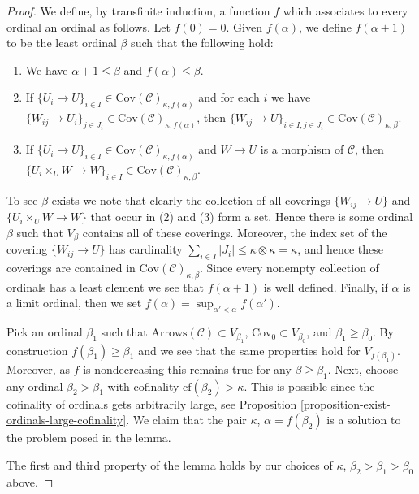 \begin{proof}
\medskip\noindent
We define, by transfinite induction, a function $f$ which associates
to every ordinal an ordinal as follows. Let $f(0) = 0$.
Given $f(\alpha)$, we define $f(\alpha + 1)$ to be the least
ordinal $\beta$ such that the following hold:
\begin{enumerate}
\item We have $\alpha + 1 \leq \beta$ and $f(\alpha) \leq \beta$.
\item If $\{U_i \to U\}_{i\in I}
\in \text{Cov}(\mathcal{C})_{\kappa, f(\alpha)}$
and for each $i$ we have
$\{W_{ij} \to U_i\}_{j\in J_i}
\in \text{Cov}(\mathcal{C})_{\kappa, f(\alpha)}$,
then
$\{W_{ij} \to U\}_{i \in I, j\in J_i}
\in \text{Cov}(\mathcal{C})_{\kappa, \beta}$.
\item If $\{U_i \to U\}_{i\in I}
\in \text{Cov}(\mathcal{C})_{\kappa, f(\alpha)}$
and $W \to U$ is a morphism of $\mathcal{C}$, then
$\{U_i \times_U W \to W \}_{i\in I}
\in \text{Cov}(\mathcal{C})_{\kappa, \beta}$.
\end{enumerate}
To see $\beta$ exists we note that clearly the collection of all
coverings $\{W_{ij} \to U\}$ and $\{U_i \times_U W \to W \}$ that occur in
(2) and (3) form a set. Hence there is some ordinal $\beta$ such that
$V_\beta$ contains all of these coverings. Moreover, the index set
of the covering $\{W_{ij} \to U\}$ has cardinality
$\sum_{i \in I} |J_i| \leq \kappa \otimes \kappa = \kappa$, and
hence these coverings are contained in
$\text{Cov}(\mathcal{C})_{\kappa, \beta}$.
Since every nonempty collection of ordinals has a least element
we see that $f(\alpha + 1)$ is well defined. Finally, if $\alpha$
is a limit ordinal, then we set
$f(\alpha) = \sup_{\alpha' < \alpha} f(\alpha')$.

\medskip\noindent
Pick an ordinal $\beta_1$ such that
$\text{Arrows}(\mathcal{C}) \subset V_{\beta_1}$,
$\text{Cov}_0 \subset V_{\beta_0}$,
and $\beta_1 \geq \beta_0$.
By construction $f(\beta_1) \geq \beta_1$ and we see that
the same properties hold for $V_{f(\beta_1)}$. Moreover, as $f$ is
nondecreasing this remains true for any $\beta \geq \beta_1$.
Next, choose any ordinal $\beta_2 > \beta_1$ with
cofinality $\text{cf}(\beta_2) > \kappa$. This is possible
since the cofinality of ordinals gets arbitrarily large, see
Proposition \ref{proposition-exist-ordinals-large-cofinality}.
We claim that the pair $\kappa$,
$\alpha = f(\beta_2)$ is a solution to the problem posed in the lemma.

\medskip\noindent
The first and third property of the lemma holds by our choices
of $\kappa$, $\beta_2 > \beta_1 > \beta_0$ above.


\end{proof}
